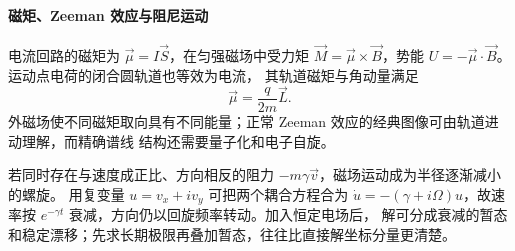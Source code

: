 \paragraph{磁矩、Zeeman 效应与阻尼运动}

电流回路的磁矩为 $\vec\mu=I\vec S$，在匀强磁场中受力矩
$\vec M=\vec\mu\times\vec B$，势能 $U=-\vec\mu\cdot\vec B$。运动点电荷的闭合圆轨道也等效为电流，
其轨道磁矩与角动量满足
\[
 \vec\mu=\frac{q}{2m}\vec L.
\]
外磁场使不同磁矩取向具有不同能量；正常 Zeeman 效应的经典图像可由轨道进动理解，而精确谱线
结构还需要量子化和电子自旋。

若同时存在与速度成正比、方向相反的阻力 $-m\gamma\vec v$，磁场运动成为半径逐渐减小的螺旋。
用复变量 $u=v_x+iv_y$ 可把两个耦合方程合为
$\dot u=-(\gamma+i\Omega)u$，故速率按 $e^{-\gamma t}$ 衰减，方向仍以回旋频率转动。加入恒定电场后，
解可分成衰减的暂态和稳定漂移；先求长期极限再叠加暂态，往往比直接解坐标分量更清楚。
